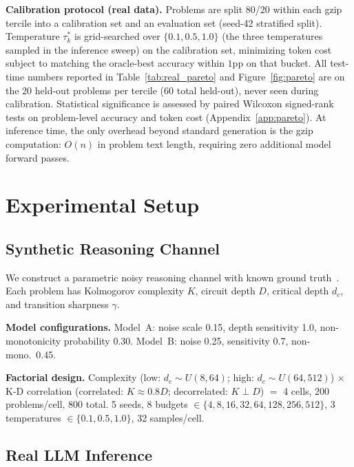 \documentclass{article}
\begin{document}
\textbf{Calibration protocol (real data).}  Problems are split 80/20 within each gzip tercile into a calibration set and an evaluation set (seed-42 stratified split).  Temperature $\tau^*_k$ is grid-searched over $\{0.1, 0.5, 1.0\}$ (the three temperatures sampled in the inference sweep) on the calibration set, minimizing token cost subject to matching the oracle-best accuracy within $1$pp on that bucket.  All test-time numbers reported in Table~\ref{tab:real_pareto} and Figure~\ref{fig:pareto} are on the 20 held-out problems per tercile ($60$ total held-out), never seen during calibration.  Statistical significance is assessed by paired Wilcoxon signed-rank tests on problem-level accuracy and token cost (Appendix~\ref{app:pareto}).  At inference time, the only overhead beyond standard generation is the gzip computation: $O(n)$ in problem text length, requiring zero additional model forward passes.

\section{Experimental Setup}
\label{sec:setup}

\subsection{Synthetic Reasoning Channel}

We construct a parametric noisy reasoning channel with known ground truth~\citep{polyanskiy2024it}.  Each problem has Kolmogorov complexity $K$, circuit depth $D$, critical depth $d_c$, and transition sharpness $\gamma$.

\textbf{Model configurations.}  Model~A: noise scale 0.15, depth sensitivity 1.0, non-monotonicity probability 0.30.  Model~B: noise 0.25, sensitivity 0.7, non-mono.\ 0.45.

\textbf{Factorial design.}  Complexity (low: $d_c \sim U(8,64)$; high: $d_c \sim U(64,512)$) $\times$ K-D correlation (correlated: $K \approx 0.8D$; decorrelated: $K \perp D$) $=$ 4 cells, 200 problems/cell, 800 total.  5 seeds, 8 budgets $\in \{4, 8, 16, 32, 64, 128, 256, 512\}$, 3 temperatures $\in \{0.1, 0.5, 1.0\}$, 32 samples/cell.

\subsection{Real LLM Inference}
\end{document}
